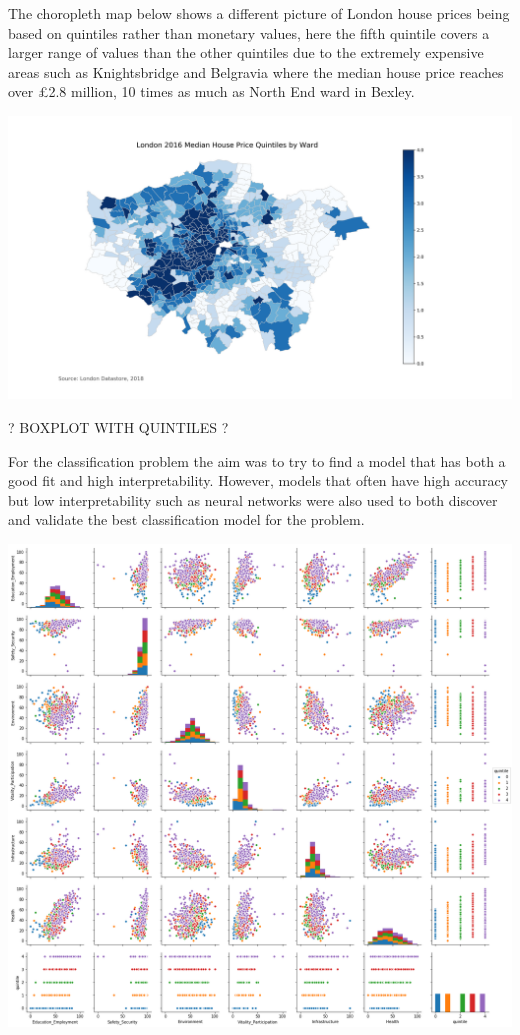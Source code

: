 The choropleth map below shows a different picture of London house prices being based on quintiles rather than monetary values, here the fifth quintile covers a larger range of values than the other quintiles due to the extremely expensive areas such as Knightsbridge and Belgravia where the median house price reaches over £2.8 million, 10 times as much as North End ward in Bexley.

\includegraphics[scale=0.4]{figures/HPQuintile} %

? BOXPLOT WITH QUINTILES ?

For the classification problem the aim was to try to find a model that has both a good fit and high interpretability. However, models that often have high accuracy but low interpretability such as neural networks were also used to both discover and validate the best classification model for the problem.

\includegraphics[scale=0.3]{figures/pairplot_quintile} %

